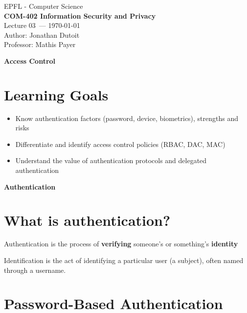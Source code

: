 \documentclass[11pt]{article}
\newcommand{\coursename}{COM-402 Information Security and Privacy}
\newcommand{\lecturenum}{03}
\newcommand{\lecturedate}{\today}
\newcommand{\professor}{Mathis Payer}
\begin{document}
\begin{center}
  {\large EPFL - Computer Science} \\[0.5em]
  {\Large \textbf{\coursename}} \\[0.5em]
  {\large Lecture \lecturenum\ --- \lecturedate} \\[0.5em]
  {\large Author: Jonathan Dutoit} \\[0.5em]
  {\large Professor: \professor} \\[0.5em]
\end{center}

\vspace{2cm}
\begin{center}
  {\LARGE \textbf{Access Control}}
\end{center}

\vspace{1cm}

\section*{Learning Goals}
\begin{itemize}
	\item Know authentication factors (password, device, biometrics), strengths and risks
	\item Differentiate and identify access control policies (RBAC, DAC, MAC)
	\item Understand the value of authentication protocols and delegated authentication
\end{itemize}

\vspace{1cm}

\begin{center}
  {\LARGE \textbf{Authentication}}
\end{center}

\vspace{1cm}

\section*{What is authentication?}

Authentication is the process of \textbf{verifying} someone's or something's \textbf{identity}

Identification is the act of identifying a particular user (a subject), often named through a username. 

\section*{Password-Based Authentication}
\end{document}
